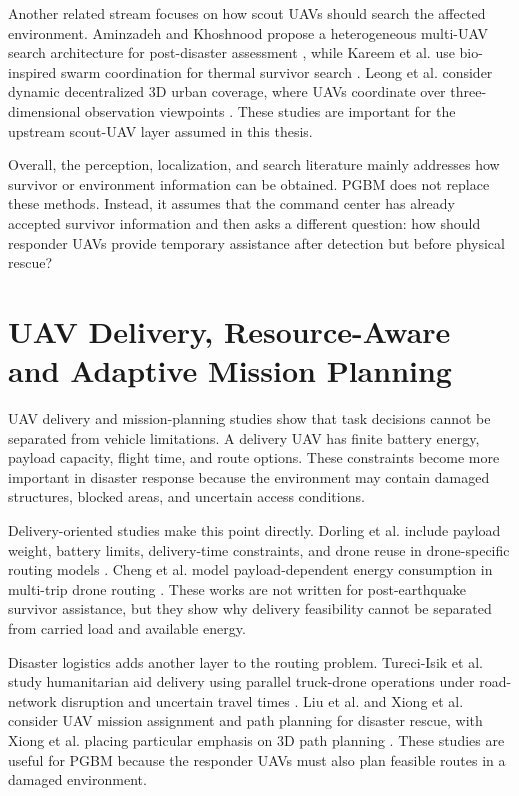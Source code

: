Another related stream focuses on how scout UAVs should search the affected
environment. Aminzadeh and Khoshnood propose a heterogeneous multi-UAV search
architecture for post-disaster assessment \cite{aminzadeh2023multiuav}, while
Kareem et al. use bio-inspired swarm coordination for thermal survivor search
\cite{kareem2026bioinspired}. Leong et al. consider dynamic decentralized 3D
urban coverage, where UAVs coordinate over three-dimensional observation
viewpoints \cite{leong2024urban3d}. These studies are important for the
upstream scout-UAV layer assumed in this thesis.

Overall, the perception, localization, and search literature mainly addresses
how survivor or environment information can be obtained. PGBM does not replace
these methods. Instead, it assumes that the command center has already accepted
survivor information and then asks a different question: how should responder
UAVs provide temporary assistance after detection but before physical rescue?

\section{UAV Delivery, Resource-Aware and Adaptive Mission Planning}
\label{sec_related_resource}

UAV delivery and mission-planning studies show that task decisions cannot be
separated from vehicle limitations. A delivery UAV has finite battery energy,
payload capacity, flight time, and route options. These constraints become more
important in disaster response because the environment may contain damaged
structures, blocked areas, and uncertain access conditions.

Delivery-oriented studies make this point directly. Dorling et al. include
payload weight, battery limits, delivery-time constraints, and drone reuse in
drone-specific routing models \cite{dorling2017dronevrp}. Cheng et al. model
payload-dependent energy consumption in multi-trip drone routing
\cite{cheng2020droneenergy}. These works are not written for post-earthquake
survivor assistance, but they show why delivery feasibility cannot be separated
from carried load and available energy.

Disaster logistics adds another layer to the routing problem. Tureci-Isik et
al. study humanitarian aid delivery using parallel truck-drone operations under
road-network disruption and uncertain travel times
\cite{tureciisik2026truckdrone}. Liu et al. and Xiong et al. consider UAV
mission assignment and path planning for disaster rescue, with Xiong et al.
placing particular emphasis on 3D path planning
\cite{liu2021multiuv,xiong2023multidrone}. These studies are useful for PGBM
because the responder UAVs must also plan feasible routes in a damaged
environment.

